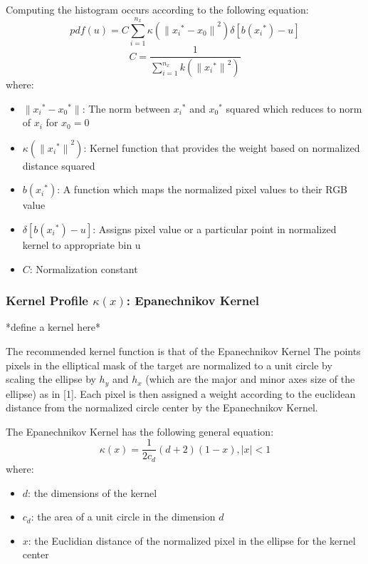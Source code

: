 Computing the histogram occurs according to the following equation:
\begin{equation}
    pdf(u)=C\sum_{i=1}^{n_x}\kappa({\parallel{x_i}^*-x_0\parallel}^2)\delta[b({x_i}^*)-u]    
\end{equation}
\begin{equation}
    C=\frac{1}{\sum_{i=1}^{n_x}k({\parallel{x_i}^*\parallel}^2)}
\end{equation}
where:
\begin{itemize}
    \item $\parallel{x_i}^*-{x_0}^*\parallel$: The norm between ${x_i}^*$ and
        ${x_0}^*$ squared which reduces to norm of $x_i$ for $x_0 = 0$ 
    \item $\kappa({\parallel{x_i}^*\parallel}^2)$: Kernel function that provides the weight based on normalized distance squared
    \item $b({x_i}^*)$: A function which maps the normalized pixel values to their RGB value
    \item $\delta[b({x_i}^*)-u]$: Assigns pixel value or a particular point in normalized kernel to appropriate bin u 
    \item $C$: Normalization constant
\end{itemize}

\subsubsection{Kernel Profile $\kappa(x)$: Epanechnikov Kernel}
*define a kernel here*

The recommended kernel function is that of the Epanechnikov Kernel
The points pixels in the elliptical mask of the target are normalized to a unit
circle by scaling the ellipse by $h_y$ and $h_x$ (which are the major and minor
axes size of the ellipse) as in [1]. Each pixel is then assigned a weight
according to the euclidean distance from the normalized circle center by the
Epanechnikov Kernel.

The Epanechnikov Kernel has the following general equation:
\begin{equation}
    \kappa(x)=\frac{1}{2 c_d}(d+2)(1-x), |x|<1
\end{equation}
where:
\begin{itemize}
   \item $d$: the dimensions of the kernel
   \item $c_d$: the area of a unit circle in the dimension $d$
   \item $x$: the Euclidian distance of the normalized pixel in the ellipse for the kernel center
\end{itemize}

